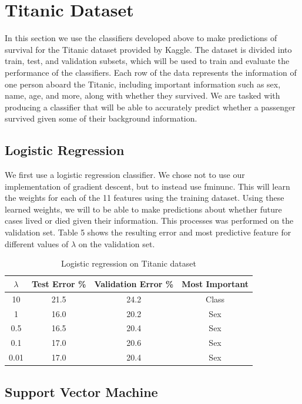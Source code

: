 \documentclass[10pt,twocolumn]{article}
\begin{document}
\section{Titanic Dataset}

In this section we use the classifiers developed above to make predictions of survival for the Titanic dataset provided by Kaggle. The dataset is divided into train, test, and validation subsets, which will be used to train and evaluate the performance of the classifiers. Each row of the data represents the information of one person aboard the Titanic, including important information such as sex, name, age, and more, along with whether they survived. We are tasked with producing a classifier that will be able to accurately predict whether a passenger survived given some of their background information.

\subsection*{Logistic Regression}

We first use a logistic regression classifier. We chose not to use our implementation of gradient descent, but to instead use fminunc. This will learn the weights for each of the 11 features using the training dataset. Using these learned weights, we will to be able to make predictions about whether future cases lived or died given their information. This processes was performed on the validation set. Table 5 shows the resulting error and most predictive feature for different values of $\lambda$ on the validation set.

\begin{table}
 \caption{Logistic regression on Titanic dataset}
  \begin{tabular}{ | c | c | c | c |}
 \hline
 $\lambda$ & Test Error \% & Validation Error \% & Most Important  \\ \hline 
 10 & 21.5 & 24.2 & Class  \\ \hline
 1 & 16.0 & 20.2 & Sex  \\ \hline
 0.5 & 16.5 & 20.4 & Sex \\ \hline
 0.1 & 17.0 & 20.6 & Sex \\ \hline 
 0.01 & 17.0 & 20.4 & Sex \\ \hline
 \end{tabular}
 \label{SVM C1 T}
\end{table}
      
\subsection*{Support Vector Machine}
\end{document}
